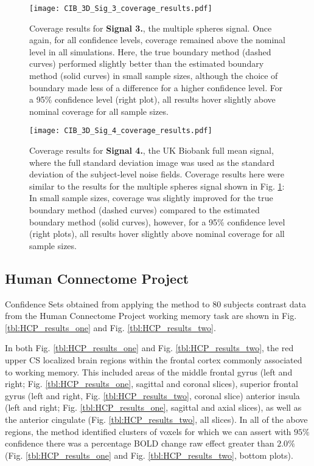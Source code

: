 \begin{figure}[htbp]
\hspace*{-1.5cm}
    \texttt{[image: CIB\_3D\_Sig\_3\_coverage\_results.pdf]}
\caption{Coverage results for \textbf{Signal 3.}, the multiple spheres signal. Once again, for all confidence levels, coverage remained above the nominal level in all simulations. Here, the true boundary method (dashed curves) performed slightly better than the estimated boundary method (solid curves) in small sample sizes, although the choice of boundary made less of a difference for a higher confidence level. For a 95\% confidence level (right plot), all results hover slightly above nominal coverage for all sample sizes.}
\label{fig:3D_sig_3_results}
\end{figure}

\begin{figure}[htbp]
\hspace*{-1.5cm}
    \texttt{[image: CIB\_3D\_Sig\_4\_coverage\_results.pdf]}
\caption{ Coverage results for \textbf{Signal 4.}, the UK Biobank full mean signal, where the full standard deviation image was used as the standard deviation of the subject-level noise fields. Coverage results here were similar to the results for the multiple spheres signal shown in Fig. \ref{fig:3D_sig_3_results}: In small sample sizes, coverage was slightly improved for the true boundary method (dashed curves) compared to the estimated boundary method (solid curves), however, for a 95\% confidence level (right plots), all results hover slightly above nominal coverage for all sample sizes.}
\label{fig:3D_sig_4_results}
\end{figure}

\subsection{Human Connectome Project}
\label{HCP_results}

Confidence Sets obtained from applying the method to 80 subjects contrast data from the Human Connectome Project working memory task are shown in Fig. \ref{tbl:HCP_results_one} and Fig. \ref{tbl:HCP_results_two}.

In both Fig. \ref{tbl:HCP_results_one} and Fig. \ref{tbl:HCP_results_two}, the red upper CS localized brain regions within the frontal cortex commonly associated to working memory. This included areas of the middle frontal gyrus (left and right; Fig. \ref{tbl:HCP_results_one}, sagittal and coronal slices), superior frontal gyrus (left and right, Fig. \ref{tbl:HCP_results_two}, coronal slice) anterior insula (left and right; Fig. \ref{tbl:HCP_results_one}, sagittal and axial slices), as well as the anterior cingulate (Fig. \ref{tbl:HCP_results_two}, all slices). In all of the above regions, the method identified clusters of voxels for which we can assert with $95\%$ confidence there was a percentage BOLD change raw effect greater than $2.0\%$ (Fig. \ref{tbl:HCP_results_one} and Fig. \ref{tbl:HCP_results_two}, bottom plots). 

